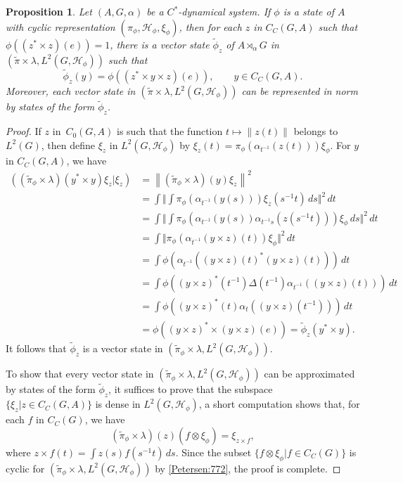 \documentclass{book}
\newtheorem{proposition}[definition]{Proposition}
\begin{document}
\begin{proposition}\label{Petersen:773}
  Let \((A,G,\alpha)\) be a \(C^*\)-dynamical system. If \(\phi\) is a state of \(A\) with 
  cyclic representation \((\pi_\phi,\mathcal{H}_\phi,\xi_\phi)\), then for each \(z\) in \(C_C(G,A)\)
  such that \(\phi((z^*\times z)(e))=1\), there is a vector state \(\tilde{\phi}_z\) of \(A\rtimes_\alpha G\)
  in \((\tilde{\pi}\times\lambda, L^2(G,\mathcal{H}_\phi))\) such that
  \[
    \tilde{\phi}_z(y)=\phi((z^*\times y\times z)(e)),\qquad y\in C_C(G,A).
  \]
  Moreover, each vector state in \((\tilde{\pi}\times\lambda,L^2(G,\mathcal{H}_\phi))\)
  can be represented in norm by states of the form \(\tilde{\phi}_z\).
\end{proposition}
\begin{proof}
  If \(z\) in\ \(C_0(G,A)\) is such that the function \(t\mapsto\|z(t)\|\) belongs to \(L^2(G)\),
  then define \(\xi_z\) in \(L^2(G,\mathcal{H}_\phi)\) by \(\xi_z(t)=\pi_\phi(\alpha_{t^{-1}}(z(t)))\xi_\phi\).
  For \(y\) in \(C_C(G,A)\), we have
  \begin{align*}
    ((\tilde{\pi}_\phi\times\lambda)(y^*\times y)\xi_z|\xi_z)&=\left\|(\tilde{\pi}_\phi\times\lambda)(y)\xi_z\right\|^2\\
    &=\int\Vert\int\pi_\phi(\alpha_{t^{-1}}(y(s)))\xi_z(s^{-1}t)\,ds \Vert^2\,dt\\
    &=\int\Vert\int\pi_\phi(\alpha_{t^{-1}}(y(s))\alpha_{t^{-1}s}(z(s^{-1}t)))\xi_\phi\,ds \Vert^2\,dt\\
    &=\int\Vert\pi_\phi(\alpha_{t^{-1}}(y\times z)(t))\xi_\phi\Vert^2\,dt\\
    &=\int\phi(\alpha_{t^{-1}}((y\times z)(t)^*(y\times z)(t)))\,dt\\
    &=\int\phi((y\times z)^*(t^{-1})\Delta(t^{-1})\alpha_{t^{-1}}((y\times z)(t)))\,dt\\
    &=\int\phi((y\times z)^*(t)\alpha_t((y\times z)(t^{-1})))\,dt\\
    &=\phi((y\times z)^*\times (y\times z)(e))=\tilde{\phi}_z(y^*\times y).
  \end{align*}
  It follows that \(\tilde{\phi}_z\) is a vector state in \((\tilde{\pi}_\phi\times\lambda,L^2(G,\mathcal{H}_\phi))\).\par
  To show that every vector state in \((\tilde{\pi}_\phi\times\lambda,L^2(G,\mathcal{H}_\phi))\) can be
  approximated by states of the form \(\tilde{\phi}_z\), it suffices to prove that the subspace \(\{\xi_z| z\in C_C(G,A)\}\) is dense in 
  \(L^2(G,\mathcal{H}_\phi)\), a short computation shows that, for each \(f\) in \(C_C(G)\), we have 
  \[
    (\tilde{\pi}_\phi\times\lambda)(z)(f\otimes\xi_\phi)=\xi_{z\times f},
  \]
  where \(z\times f(t)=\int z(s)f(s^{-1}t)\,ds\). Since the subset \(\{f\otimes\xi_\phi| f\in C_C(G)\}\)
  is cyclic for \((\tilde{\pi}_\phi\times\lambda,L^2(G,\mathcal{H}_\phi))\) by \ref{Petersen:772}, the proof is complete.
\end{proof}
\end{document}
